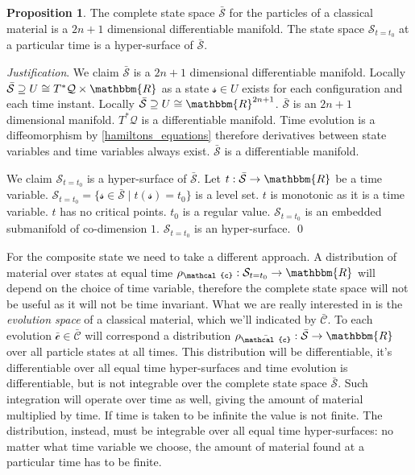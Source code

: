 \documentclass[aps,pra,10pt,twocolumn,floatfix,nofootinbib]{revtex4-1}
\numberwithin{equation}{section}
\theoremstyle{definition}
\newtheorem{prop}[equation]{Proposition}
\newenvironment{justification}{\emph{Justification}.}{\qed}
\begin{document}
\begin{prop}\label{complete_particle_state_space}
	The complete state space $\bar{\mathcal{S}}$ for the particles of a classical material is a $2n+1$ dimensional differentiable manifold. The state space $\mathcal{S}_{t=t_0}$ at a particular time is a hyper-surface of $\bar{\mathcal{S}}$.
\end{prop}

\begin{justification}
	We claim $\bar{\mathcal{S}}$ is a $2n+1$ dimensional differentiable manifold. Locally $\bar{\mathcal{S}} \supseteq U \cong T^*\mathcal{Q}\times \mathbbm{R}$ as a state $\mathcal{s} \in U$ exists for each configuration and each time instant. Locally $\bar{\mathcal{S}} \supseteq U \cong\mathbbm{R}^{2n+1}$. $\bar{\mathcal{S}}$ is an $2n+1$ dimensional manifold. $T^*\mathcal{Q}$ is a differentiable manifold. Time evolution is a diffeomorphism by \ref{hamiltons_equations} therefore derivatives between state variables and time variables always exist. $\bar{\mathcal{S}}$ is a differentiable manifold.
	
	We claim $\mathcal{S}_{t=t_0}$ is a hyper-surface of $\bar{\mathcal{S}}$. Let $t : \bar{\mathcal{S}} \rightarrow \mathbbm{R}$ be a time variable. $\mathcal{S}_{t=t_0} = \{ \mathcal{s} \in \bar{\mathcal{S}} \; | \; t(\mathcal{s}) = t_0 \}$ is a level set. $t$ is monotonic as it is a time variable. $t$ has no critical points. $t_0$ is a regular value. $\mathcal{S}_{t=t_0}$ is an embedded submanifold of co-dimension $1$. $\mathcal{S}_{t=t_0}$ is an hyper-surface.
\end{justification}

For the composite state we need to take a different approach. A distribution of material over states at equal time $\rho_\mathcal{c} : \mathcal{S}_{t=t_0} \rightarrow \mathbbm{R}$ will depend on the choice of time variable, therefore the complete state space will not be useful as it will not be time invariant. What we are really interested in is the \emph{evolution space} of a classical material, which we'll indicated by $\bar{\mathcal{C}}$. To each evolution $\bar{\mathcal{c}} \in \bar{\mathcal{C}}$ will correspond a distribution $\rho_{\bar{\mathcal{c}}} : \bar{\mathcal{S}} \rightarrow \mathbbm{R}$ over all particle states at all times. This distribution will be differentiable, it's differentiable over all equal time hyper-surfaces and time evolution is differentiable, but is not integrable over the complete state space $\bar{\mathcal{S}}$. Such integration will operate over time as well, giving the amount of material multiplied by time. If time is taken to be infinite the value is not finite. The distribution, instead, must be integrable over all equal time hyper-surfaces: no matter what time variable we choose, the amount of material found at a particular time has to be finite.
\end{document}
